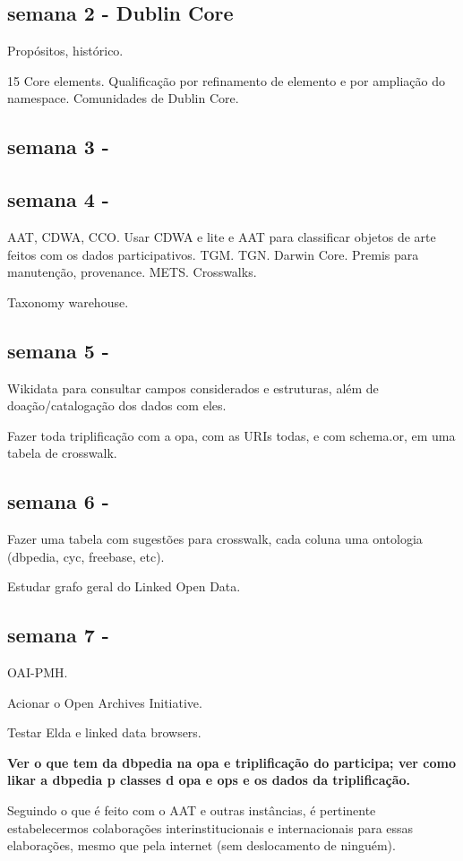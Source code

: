 \documentclass[12pt]{report}
\newcommand{\VV}[1]{{\bf \color{red} #1}}
\begin{document}
\subsection{semana 2 - Dublin Core}
Propósitos, histórico.

15 Core elements. Qualificação por refinamento de elemento e por ampliação do namespace. Comunidades de Dublin Core.
\subsection{semana 3 - }
\subsection{semana 4 - }
AAT, CDWA, CCO.
Usar CDWA e lite e AAT para classificar objetos de arte feitos com os dados participativos. TGM. TGN. Darwin Core. Premis para manutenção, provenance.
METS. Crosswalks.

Taxonomy warehouse.
\subsection{semana 5 - }
Wikidata para consultar campos considerados e estruturas, além de doação/catalogação dos dados com eles.

Fazer toda triplificação com a opa, com as URIs todas, e com schema.or, em uma tabela de crosswalk.

\subsection{semana 6 - }
Fazer uma tabela com sugestões para crosswalk, cada coluna uma ontologia (dbpedia, cyc, freebase, etc).

Estudar grafo geral do Linked Open Data.

\subsection{semana 7 - }
OAI-PMH.

Acionar o Open Archives Initiative.

Testar Elda e linked data browsers.


\VV{Ver o que tem da dbpedia na opa e triplificação do participa; ver como likar a dbpedia p classes d opa e ops e os dados da triplificação.}

Seguindo o que é feito com o AAT e outras instâncias, é pertinente estabelecermos colaborações interinstitucionais e internacionais para essas elaborações, mesmo que pela internet (sem deslocamento de ninguém).
\end{document}

